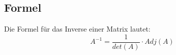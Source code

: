 \subsection{Formel}
Die Formel für das Inverse einer Matrix lautet:
\[
    A^{-1}=\frac{1}{det(A)}\cdot Adj(A)
\]